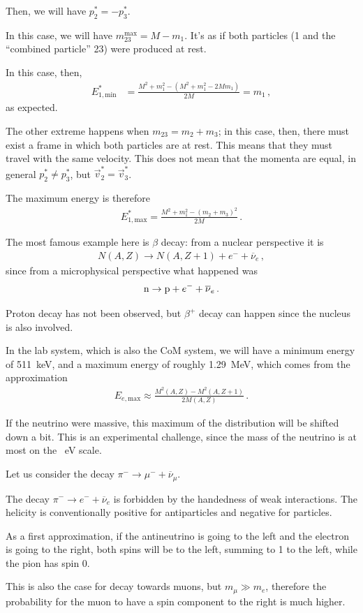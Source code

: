 \documentclass[main.tex]{subfiles}
\begin{document}
Then, we will have \(p^{*}_2 = -p^{*}_3\). 

In this case, we will have \(m_{23}^{\text{max}} = M - m_1 \). It's as if both particles (1 and the ``combined particle'' 23) were produced at rest. 

In this case, then, 
%
\begin{align}
E^{*}_{1, \text{min}} &= \frac{M^2 + m_1^2 - (M^2 + m_1^2 - 2 M m_1 )}{2M} = m_1
\,,
\end{align}
%
as expected. 

The other extreme happens when \(m_{23} = m_2 + m_3 \); in this case, then, there must exist a frame in which both particles are at rest. 
This means that they must travel with the same velocity. 
This does not mean that the momenta are equal, in general \(p^{*}_2 \neq p^{*}_3\), but \(\vec{v}^{*}_2 = \vec{v}^{*}_3\).

The maximum energy is therefore 
%
\begin{align}
E^{*}_{1, \text{max}} = \frac{M^2 + m_1^2 - (m_2 + m_3 )^2}{2 M }
\,.
\end{align}

The most famous example here is \(\beta \) decay: from a nuclear perspective it is 
%
\begin{align}
N(A, Z) \to N(A, Z+1) + e^{-} + \overline{\nu}_e
\,,
\end{align}
%
since from a microphysical perspective what happened was
%
\begin{align}
\ce{n} \to \ce{p} + e^{-} + \overline{\nu}_{e}
\,.
\end{align}

Proton decay has not been observed, but \(\beta^{+}\) decay can happen since the nucleus is also involved. 

In the lab system, which is also the CoM system, we will have a minimum energy of \SI{511}{keV}, and a maximum energy of roughly \SI{1.29}{MeV}, which comes from the approximation 
%
\begin{align}
E _{e, \text{max}} \approx \frac{M^2(A, Z) - M^2 (A, Z+1)}{2 M(A, Z)}
\,.
\end{align}

If the neutrino were massive, this maximum of the distribution will be shifted down a bit.
This is an experimental challenge, since the mass of the neutrino is at most on the \SI{}{eV} scale. 

Let us consider the decay \(\pi^{-} \to \mu^{-} + \overline{\nu}_\mu \). 

The decay \(\pi^{-} \to e^{-} + \overline{\nu}_e\) is forbidden by the handedness of weak interactions. 
The helicity is conventionally positive for antiparticles and negative for particles. 

As a first approximation, if the antineutrino is going to the left and the electron is going to the right, both spins will be to the left, summing to 1 to the left, while the pion has spin 0. 

This is also the case for decay towards muons, but \(m_\mu \gg m_e\), therefore the probability for the muon to have a spin component to the right is much higher. 
\end{document}
